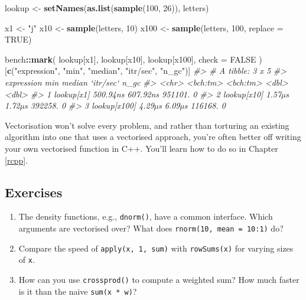 \documentclass[]{book}
\newenvironment{Shaded}{\begin{snugshade}}{\end{snugshade}}
\newcommand{\CommentTok}[1]{\textcolor[rgb]{0.37,0.37,0.37}{\textit{#1}}}
\newcommand{\DataTypeTok}[1]{\textcolor[rgb]{0.27,0.27,0.27}{#1}}
\newcommand{\DecValTok}[1]{\textcolor[rgb]{0.06,0.06,0.06}{#1}}
\newcommand{\KeywordTok}[1]{\textcolor[rgb]{0.27,0.27,0.27}{\textbf{#1}}}
\newcommand{\NormalTok}[1]{#1}
\newcommand{\OperatorTok}[1]{\textcolor[rgb]{0.43,0.43,0.43}{\textbf{#1}}}
\newcommand{\OtherTok}[1]{\textcolor[rgb]{0.37,0.37,0.37}{#1}}
\newcommand{\StringTok}[1]{\textcolor[rgb]{0.5,0.5,0.5}{#1}}
\begin{document}
\begin{Shaded}
\begin{Highlighting}[]
\NormalTok{lookup <-}\StringTok{ }\KeywordTok{setNames}\NormalTok{(}\KeywordTok{as.list}\NormalTok{(}\KeywordTok{sample}\NormalTok{(}\DecValTok{100}\NormalTok{, }\DecValTok{26}\NormalTok{)), letters)}

\NormalTok{x1 <-}\StringTok{ "j"}
\NormalTok{x10 <-}\StringTok{ }\KeywordTok{sample}\NormalTok{(letters, }\DecValTok{10}\NormalTok{)}
\NormalTok{x100 <-}\StringTok{ }\KeywordTok{sample}\NormalTok{(letters, }\DecValTok{100}\NormalTok{, }\DataTypeTok{replace =} \OtherTok{TRUE}\NormalTok{)}

\NormalTok{bench}\OperatorTok{::}\KeywordTok{mark}\NormalTok{(}
\NormalTok{  lookup[x1],}
\NormalTok{  lookup[x10],}
\NormalTok{  lookup[x100],}
  \DataTypeTok{check =} \OtherTok{FALSE}
\NormalTok{)[}\KeywordTok{c}\NormalTok{(}\StringTok{"expression"}\NormalTok{, }\StringTok{"min"}\NormalTok{, }\StringTok{"median"}\NormalTok{, }\StringTok{"itr/sec"}\NormalTok{, }\StringTok{"n_gc"}\NormalTok{)]}
\CommentTok{#> # A tibble: 3 x 5}
\CommentTok{#>   expression        min   median `itr/sec`  n_gc}
\CommentTok{#>   <chr>        <bch:tm> <bch:tm>     <dbl> <dbl>}
\CommentTok{#> 1 lookup[x1]   500.94ns 607.92ns   951101.     0}
\CommentTok{#> 2 lookup[x10]    1.57µs   1.72µs   392258.     0}
\CommentTok{#> 3 lookup[x100]   4.29µs   6.09µs   116168.     0}
\end{Highlighting}
\end{Shaded}

Vectorisation won't solve every problem, and rather than torturing an existing algorithm into one that uses a vectorised approach, you're often better off writing your own vectorised function in C++. You'll learn how to do so in Chapter \ref{rcpp}.

\hypertarget{exercises-20}{%
\subsection{Exercises}\label{exercises-20}}

\begin{enumerate}
\def\labelenumi{\arabic{enumi}.}
\item
  The density functions, e.g., \texttt{dnorm()}, have a common interface. Which
  arguments are vectorised over? What does \texttt{rnorm(10,\ mean\ =\ 10:1)} do?
\item
  Compare the speed of \texttt{apply(x,\ 1,\ sum)} with \texttt{rowSums(x)} for varying sizes
  of \texttt{x}.
\item
  How can you use \texttt{crossprod()} to compute a weighted sum? How much faster is
  it than the naive \texttt{sum(x\ *\ w)}?
\end{enumerate}
\end{document}
